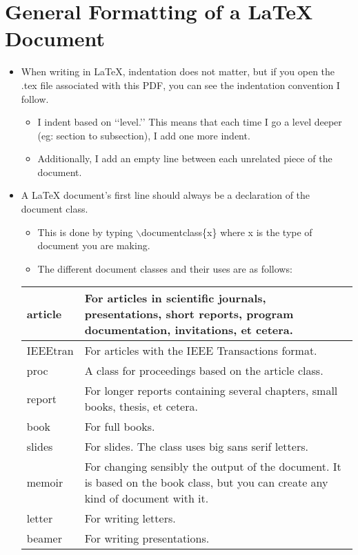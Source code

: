 \section{General Formatting of a \LaTeX{} Document}
	\begin{itemize}
		\item When writing in \LaTeX{}, indentation does not matter, but if you open the .tex file associated with this PDF, you can see the indentation convention I follow.
		\begin{itemize}
			\item I indent based on \lq\lq{}level.\rq\rq{} This means that each time I go a level deeper (eg: section to subsection), I add one more indent.
			\item Additionally, I add an empty line between each unrelated piece of the document.
		\end{itemize}
		\item A \LaTeX{} document\rq{}s first line should always be a declaration of the document class.
		\begin{itemize}
			\item This is done by typing $\backslash$documentclass\{x\} where x is the type of document you are making.
			\item The different document classes and their uses are as follows:
		\end{itemize}
		\def\arraystretch{1.5}
		\begin{tabularx}{\textwidth}{|l|X|}
			\hline
			article & For articles in scientific journals, presentations, short reports, program documentation, invitations, et cetera.\\
			\hline
			IEEEtran & For articles with the IEEE Transactions format.\\
			\hline
			proc & A class for proceedings based on the article class.\\
			\hline
			report & For longer reports containing several chapters, small books, thesis, et cetera.\\
			\hline
			book & For full books.\\
			\hline
			slides & For slides. The class uses big sans serif letters.\\
			\hline
			memoir & For changing sensibly the output of the document. It is based on the book class, but you can create any kind of document with it.\\
			\hline
			letter & For writing letters.\\
			\hline
			beamer & For writing presentations.\\

\end{tabularx}
\end{itemize}
